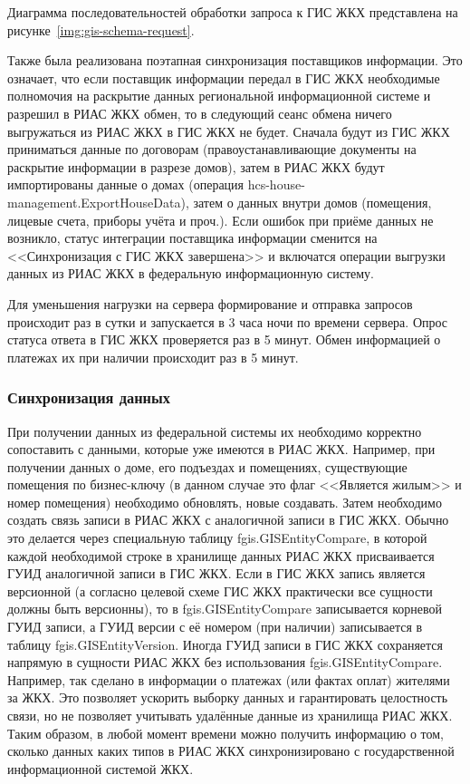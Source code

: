 Диаграмма последовательностей обработки запроса к ГИС ЖКХ представлена на рисунке~\ref{img:gis-schema-request}.


Также была реализована поэтапная синхронизация поставщиков информации.
Это означает, что если поставщик информации передал в ГИС ЖКХ необходимые полномочия на раскрытие данных региональной информационной системе и разрешил в РИАС ЖКХ обмен, то в следующий сеанс обмена ничего выгружаться из РИАС ЖКХ в ГИС ЖКХ не будет.
Сначала будут из ГИС ЖКХ приниматься данные по договорам (правоустанавливающие документы на раскрытие информации в разрезе домов), затем в РИАС ЖКХ будут импортированы данные о домах (операция hcs-house-management.ExportHouseData), затем о данных внутри домов (помещения, лицевые счета, приборы учёта и проч.).
Если ошибок при приёме данных не возникло, статус интеграции поставщика информации сменится на <<Синхронизация с ГИС ЖКХ завершена>> и включатся операции выгрузки данных из РИАС ЖКХ в федеральную информационную систему.

Для уменьшения нагрузки на сервера формирование и отправка запросов происходит раз в сутки и запускается в 3 часа ночи по времени сервера.
Опрос статуса ответа в ГИС ЖКХ проверяется раз в 5 минут.
Обмен информацией о платежах их при наличии происходит раз в 5 минут.

\subsubsection{Синхронизация данных}

При получении данных из федеральной системы их необходимо корректно сопоставить с данными, которые уже имеются в РИАС ЖКХ.
Например, при получении данных о доме, его подъездах и помещениях, существующие помещения по бизнес-ключу (в данном случае это флаг <<Является жилым>> и номер помещения) необходимо обновлять, новые создавать.
Затем необходимо создать связь записи в РИАС ЖКХ с аналогичной записи в ГИС ЖКХ.
Обычно это делается через специальную таблицу fgis.GISEntityCompare, в которой каждой необходимой строке в хранилище данных РИАС ЖКХ присваивается ГУИД аналогичной записи в ГИС ЖКХ.
Если в ГИС ЖКХ запись является версионной (а согласно целевой схеме ГИС ЖКХ практически все сущности должны быть версионны), то в fgis.GISEntityCompare записывается корневой ГУИД записи, а ГУИД версии с её номером (при наличии) записывается в таблицу fgis.GISEntityVersion.
Иногда ГУИД записи в ГИС ЖКХ сохраняется напрямую в сущности РИАС ЖКХ без использования fgis.GISEntityCompare.
Например, так сделано в информации о платежах (или фактах оплат) жителями за ЖКХ.
Это позволяет ускорить выборку данных и гарантировать целостность связи, но не позволяет учитывать удалённые данные из хранилища РИАС ЖКХ.
Таким образом, в любой момент времени можно получить информацию о том, сколько данных каких типов в РИАС ЖКХ синхронизировано с государственной информационной системой ЖКХ.

